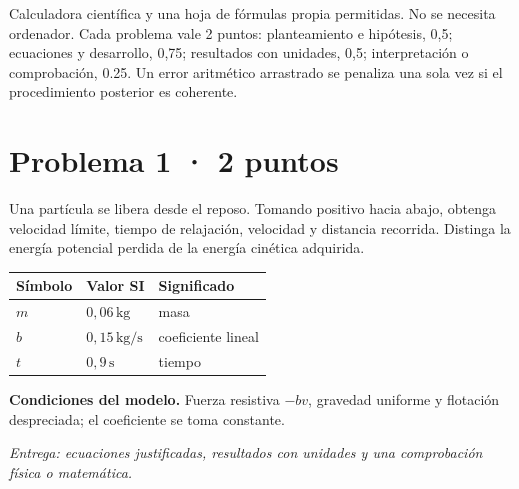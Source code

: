 Calculadora científica y una hoja de fórmulas propia permitidas. No se necesita ordenador. Cada problema vale 2 puntos: planteamiento e hipótesis, 0,5; ecuaciones y desarrollo, 0,75; resultados con unidades, 0,5; interpretación o comprobación, 0.25. Un error aritmético arrastrado se penaliza una sola vez si el procedimiento posterior es coherente.


\par\medskip\noindent\begin{minipage}{\linewidth}

\section{Problema 1 · 2 puntos}

Una partícula se libera desde el reposo. Tomando positivo hacia abajo, obtenga velocidad límite, tiempo de relajación, velocidad y distancia recorrida. Distinga la energía potencial perdida de la energía cinética adquirida.

\begin{tabular}{@{}p{.15\linewidth}p{.23\linewidth}p{.54\linewidth}@{}}
\toprule Símbolo & Valor SI & Significado\\\midrule
$m$ & $0{,}06\,\mathrm{kg}$ & masa\\
$b$ & $0{,}15\,\mathrm{kg/s}$ & coeficiente lineal\\
$t$ & $0{,}9\,\mathrm{s}$ & tiempo\\
\bottomrule\end{tabular}

\par\medskip\textbf{Condiciones del modelo.} Fuerza resistiva $-bv$, gravedad uniforme y flotación despreciada; el coeficiente se toma constante.

\par\textit{Entrega: ecuaciones justificadas, resultados con unidades y una comprobación física o matemática.}

\end{minipage}\par\medskip

